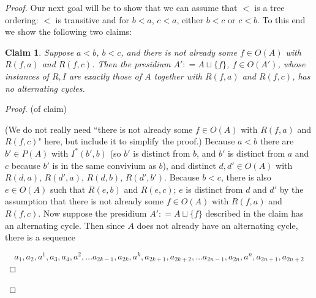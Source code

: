 \documentclass[10pt,a4paper]{amsart}
\newtheorem{claim}{Claim}
\begin{document}
\begin{proof}
Our next goal will be to show that we can assume that $<$ is a tree ordering: $<$ is transitive and for $b < a$, $c< a$, either $b < c$ or $c < b$. To this end we show the following two claims:


\begin{claim}
    \label{order construction 2} Suppose $a < b$, $b < c$, and there is not already some $f\in O(A)$ with $R(f, a)$ and $R(f, c)$. Then the presidium $A' : = A \sqcup \{f\}$, $f \in O(A')$, whose instances of $R, I$ are exactly those of $A$ together with $R(f, a)$ and $R(f, c)$, has no alternating cycles.
\end{claim}


\begin{proof}
(of claim) 

(We do not really need ``there is not already some $f\in O(A)$ with $R(f, a)$ and $R(f, c)$" here, but include it to simplify the proof.) Because $a < b$ there are $b' \in P(A)$ with $I^{*}(b', b)$ (so $b'$ is distinct from $b$, and $b'$ is distinct from $a$ and $c$ because $b'$ is in the same convivium as $b$), and distinct $d, d' \in O(A)$ with $R(d, a)$, $R(d', a)$, $R(d, b)$, $R(d', b')$. Because $b < c$, there is also $e \in O(A)$  such that $R(e, b)$ and $R(e, c)$; $e$ is distinct from $d $ and $d'$ by the assumption that there is not already some $f\in O(A)$ with $R(f, a)$ and $R(f, c)$. Now suppose the presidium $A' : = A \sqcup \{f\}$ described in the claim has an alternating cycle. Then since $A$ does not already have an alternating cycle, there is a sequence 

  $$a_1, a_2, a^{1}, a_{3}, a_{4}, a^{2}, \ldots a_{2k-1}, a_{2k}, a^{k}, a_{2k+1}, a_{2k+2}, \ldots a_{2n-1}, a_{2n}, a^{n}, a_{2n+1}, a_{2n+2} $$


\end{proof}
\end{proof}
\end{document}
